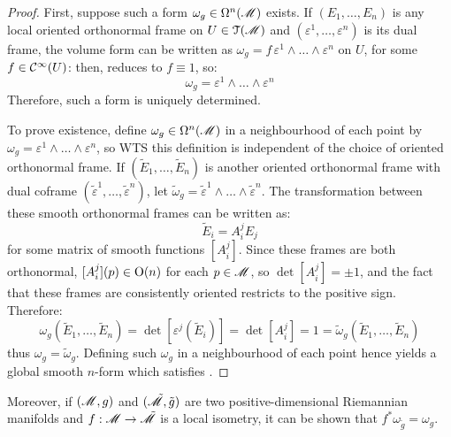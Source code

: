 \begin{proofbox}
  \begin{proof}
    First, suppose such a form $ \omega_g \in \Omega^{n}(\mathscr{M}) $ exists. If $ (E_1 , \dots , E_n) $ is any local oriented orthonormal frame on $ U \in \EuScript{T}(\mathscr{M}) $ and $ (\varepsilon^1 , \dots , \varepsilon^n) $ is its dual frame, the volume form can be written as $ \omega_g = f \, \varepsilon^1 \wedge \dots \wedge \varepsilon^n $ on $ U $, for some $ f \in \mathcal{C}^{\infty}(U) $: then,  reduces to $ f \equiv 1 $, so:
    \begin{equation*}
      \omega_g = \varepsilon^1 \wedge \dots \wedge \varepsilon^n
    \end{equation*}
    Therefore, such a form is uniquely determined.

    To prove existence, define $ \omega_g \in \Omega^{n}(\mathscr{M}) $ in a neighbourhood of each point by $ \omega_g = \varepsilon^1 \wedge \dots \wedge \varepsilon^n $, so WTS this definition is independent of the choice of oriented orthonormal frame. If $ (\tilde{E}_1 , \dots , \tilde{E}_n) $ is another oriented orthonormal frame with dual coframe $ (\tilde{\varepsilon}^1 , \dots , \tilde{\varepsilon}^n) $, let $ \tilde{\omega}_g = \tilde{\varepsilon}^1 \wedge \dots \wedge \tilde{\varepsilon}^n $. The transformation between these smooth orthonormal frames can be written as:
    \begin{equation*}
      \tilde{E}_i = A_i^j E_j
    \end{equation*}
    for some matrix of smooth functions $ [A_i^j] $. Since these frames are both orthonormal, $ [A_i^j](p) \in \mathrm{O}(n) $ for each $ p \in \mathscr{M} $, so $ \det [A_i^j] = \pm 1 $, and the fact that these frames are consistently oriented restricts to the positive sign. Therefore:
    \begin{equation*}
      \omega_g(\tilde{E}_1 , \dots , \tilde{E}_n) = \det [\varepsilon^j(\tilde{E}_i)] = \det [A_i^j] = 1 = \tilde{\omega}_g(\tilde{E}_1 , \dots , \tilde{E}_n)
    \end{equation*}
    thus $ \omega_g = \tilde{\omega}_g $. Defining such $ \omega_g $ in a neighbourhood of each point hence yields a global smooth $ n $-form which satisfies .
  \end{proof}
\end{proofbox}

Moreover, if $ (\mathscr{M} , g) $ and $ (\tilde{\mathscr{M}} , \tilde{g}) $ are two positive-dimensional Riemannian manifolds and $ f : \mathscr{M} \rightarrow \tilde{\mathscr{M}} $ is a local isometry, it can be shown that $ f^* \omega_{\tilde{g}} = \omega_g $.

